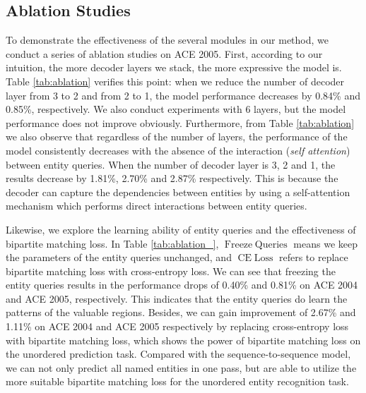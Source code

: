 \documentclass{article}
\begin{document}
\subsection{Ablation Studies}
To demonstrate the effectiveness of the several modules in our method, we conduct a series of ablation studies on ACE 2005. First, according to our intuition, the more decoder layers we stack, the more expressive the model is. Table \ref{tab:ablation} verifies this point: when we reduce the number of decoder layer from 3 to 2 and from 2 to 1, the model performance decreases by 0.84\% and 0.85\%, respectively. We also conduct experiments with 6 layers, but the model performance does not improve obviously. Furthermore, from Table \ref{tab:ablation} we also observe that regardless of the number of layers, the performance of the model consistently decreases with the absence of the interaction (\textit{self attention}) between entity queries. When the number of decoder layer is 3, 2 and 1, the results decrease by 1.81\%, 2.70\% and 2.87\% respectively. This is because the decoder can capture the dependencies between entities by using a self-attention mechanism which performs direct interactions between entity queries.

Likewise, we explore the learning ability of entity queries and the effectiveness of bipartite matching loss. In Table \ref{tab:ablation_}, $\operatorname{Freeze \; Queries}$ means we keep the parameters of the entity queries unchanged, and $\operatorname{CE \; Loss}$ refers to replace bipartite matching loss with cross-entropy loss. We can see that freezing the entity queries results in the performance drops of 0.40\% and 0.81\% on ACE 2004 and ACE 2005, respectively. This indicates that the entity queries do learn the patterns of the valuable regions. Besides, we can gain improvement of 2.67\% and 1.11\% on ACE 2004 and ACE 2005 respectively by replacing cross-entropy loss with bipartite matching loss, which shows the power of bipartite matching loss on the unordered prediction task. Compared with the sequence-to-sequence model, we can not only predict all named entities in one pass, but are able to utilize the more suitable bipartite matching loss for the unordered entity recognition task.
\end{document}
